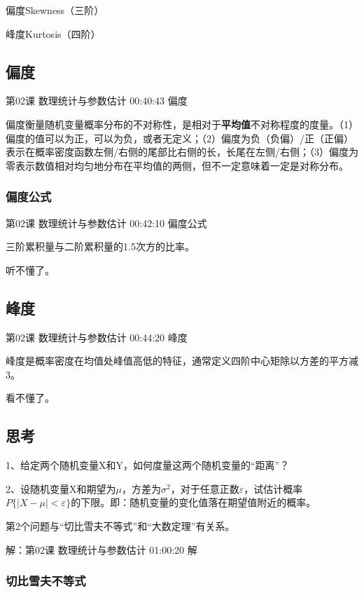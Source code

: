 \documentclass[UTF8]{ctexart}
\begin{document}
偏度Skewness（三阶）

峰度Kurtosis（四阶）

\subsection{偏度}

第02课 数理统计与参数估计 00:40:43 偏度

偏度衡量随机变量概率分布的不对称性，是相对于\textbf{平均值}不对称程度的度量。（1）偏度的值可以为正，可以为负，或者无定义；（2）偏度为负（负偏）/正（正偏）表示在概率密度函数左侧/右侧的尾部比右侧的长，长尾在左侧/右侧；（3）偏度为零表示数值相对均匀地分布在平均值的两侧，但不一定意味着一定是对称分布。

\subsubsection{偏度公式}

第02课 数理统计与参数估计 00:42:10 偏度公式

三阶累积量与二阶累积量的1.5次方的比率。

听不懂了。

\subsection{峰度}

第02课 数理统计与参数估计 00:44:20 峰度

峰度是概率密度在均值处峰值高低的特征，通常定义四阶中心矩除以方差的平方减3。

看不懂了。

\subsection{思考}

1、给定两个随机变量X和Y，如何度量这两个随机变量的“距离”？

2、设随机变量X和期望为$\mu$，方差为$\sigma^{2}$，对于任意正数$\varepsilon$，试估计概率$P\{|X-\mu| < \varepsilon \}$的下限。即：随机变量的变化值落在期望值附近的概率。

第2个问题与“切比雪夫不等式”和“大数定理”有关系。

解：第02课 数理统计与参数估计 01:00:20 解

\subsubsection{切比雪夫不等式}
\end{document}

